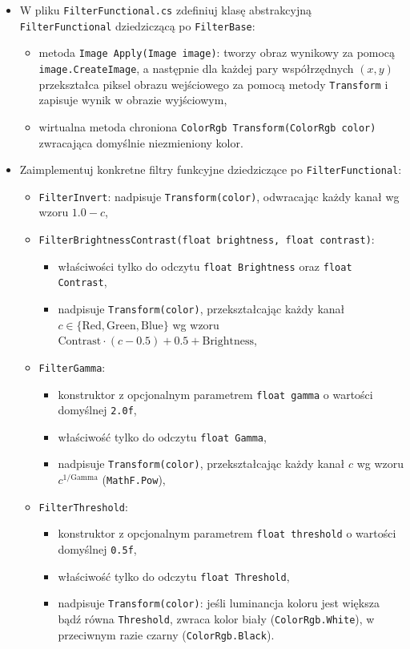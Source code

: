\documentclass[11pt,a4paper,addpoints]{exam}
\begin{document}
\begin{questions}
\begin{itemize}
    \item W pliku \texttt{FilterFunctional.cs} zdefiniuj klasę abstrakcyjną \texttt{FilterFunctional} dziedziczącą po \texttt{FilterBase}:
    \begin{itemize}
        \item metoda \texttt{Image Apply(Image image)}: tworzy obraz wynikowy za pomocą \texttt{image.CreateImage}, a następnie dla każdej pary współrzędnych $(x, y)$ przekształca piksel obrazu wejściowego za pomocą metody \texttt{Transform} i zapisuje wynik w obrazie wyjściowym,
        \item wirtualna metoda chroniona \texttt{ColorRgb Transform(ColorRgb color)} zwracająca domyślnie niezmieniony kolor.
    \end{itemize}

    \item Zaimplementuj konkretne filtry funkcyjne dziedziczące po \texttt{FilterFunctional}:
    \begin{itemize}
        \item \texttt{FilterInvert}: nadpisuje \texttt{Transform(color)}, odwracając każdy kanał wg wzoru $1.0 - c$,
        \item \texttt{FilterBrightnessContrast(float brightness, float contrast)}:
        \begin{itemize}
            \item właściwości tylko do odczytu \texttt{float Brightness} oraz \texttt{float Contrast},
            \item nadpisuje \texttt{Transform(color)}, przekształcając każdy kanał $c \in \{\text{Red}, \text{Green}, \text{Blue}\}$ wg wzoru $\text{Contrast} \cdot (c - 0.5) + 0.5 + \text{Brightness}$,
        \end{itemize}
        \item \texttt{FilterGamma}:
        \begin{itemize}
            \item konstruktor z opcjonalnym parametrem \texttt{float gamma} o wartości domyślnej \texttt{2.0f},
            \item właściwość tylko do odczytu \texttt{float Gamma},
            \item nadpisuje \texttt{Transform(color)}, przekształcając każdy kanał $c$ wg wzoru $c^{1/\text{Gamma}}$ (\texttt{MathF.Pow}),
        \end{itemize}
        \item \texttt{FilterThreshold}:
        \begin{itemize}
            \item konstruktor z opcjonalnym parametrem \texttt{float threshold} o wartości domyślnej \texttt{0.5f},
            \item właściwość tylko do odczytu \texttt{float Threshold},
            \item nadpisuje \texttt{Transform(color)}: jeśli luminancja koloru jest większa bądź równa \texttt{Threshold}, zwraca kolor biały (\texttt{ColorRgb.White}), w przeciwnym razie czarny (\texttt{ColorRgb.Black}).
        \end{itemize}
    \end{itemize}
\end{itemize}


\end{questions}
\end{document}
